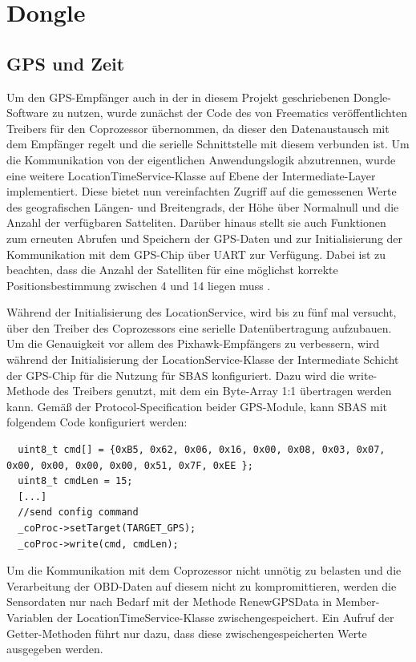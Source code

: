 \section{Dongle}

\subsection{GPS und Zeit} 
\label{ImplGpsUndZeit}
Um den GPS-Empfänger auch in der in diesem Projekt geschriebenen Dongle-Software zu nutzen, wurde zunächst der Code des von Freematics veröffentlichten Treibers für den Coprozessor übernommen, da dieser den Datenaustausch mit dem Empfänger regelt und die serielle Schnittstelle mit diesem verbunden ist. Um die Kommunikation von der eigentlichen Anwendungslogik abzutrennen, wurde eine weitere LocationTimeService-Klasse auf Ebene der Intermediate-Layer implementiert. Diese bietet nun vereinfachten Zugriff auf die gemessenen Werte des geografischen Längen- und Breitengrads, der Höhe über Normalnull und die Anzahl der verfügbaren Satteliten. Darüber hinaus stellt sie auch Funktionen zum erneuten Abrufen und Speichern der GPS-Daten und zur Initialisierung der Kommunikation mit dem GPS-Chip über UART zur Verfügung. Dabei ist zu beachten, dass die Anzahl der Satelliten für eine möglichst korrekte Positionsbestimmung zwischen 4 und 14 liegen muss \cite{gpsPrecision}.

Während der Initialisierung des LocationService, wird bis zu fünf mal versucht, über den Treiber des Coprozessors eine serielle Datenübertragung aufzubauen. Um die Genauigkeit vor allem des Pixhawk-Empfängers zu verbessern, wird während der Initialisierung der LocationService-Klasse der Intermediate Schicht der GPS-Chip für die Nutzung für \ac{SBAS} konfiguriert. Dazu wird die write-Methode des Treibers genutzt, mit dem ein Byte-Array 1:1 übertragen werden kann.
Gemäß der Protocol-Specification beider GPS-Module, kann SBAS mit folgendem Code konfiguriert werden:
\begin{lstlisting}
  uint8_t cmd[] = {0xB5, 0x62, 0x06, 0x16, 0x00, 0x08, 0x03, 0x07, 0x00, 0x00, 0x00, 0x00, 0x51, 0x7F, 0xEE };
  uint8_t cmdLen = 15;
  [...]
  //send config command
  _coProc->setTarget(TARGET_GPS);
  _coProc->write(cmd, cmdLen);
\end{lstlisting}

Um die Kommunikation mit dem Coprozessor nicht unnötig zu belasten und die Verarbeitung der OBD-Daten auf diesem nicht zu kompromittieren, werden die Sensordaten nur nach Bedarf mit der Methode RenewGPSData in Member-Variablen der LocationTimeService-Klasse zwischengespeichert. Ein Aufruf der Getter-Methoden führt nur dazu, dass diese zwischengespeicherten Werte ausgegeben werden.
